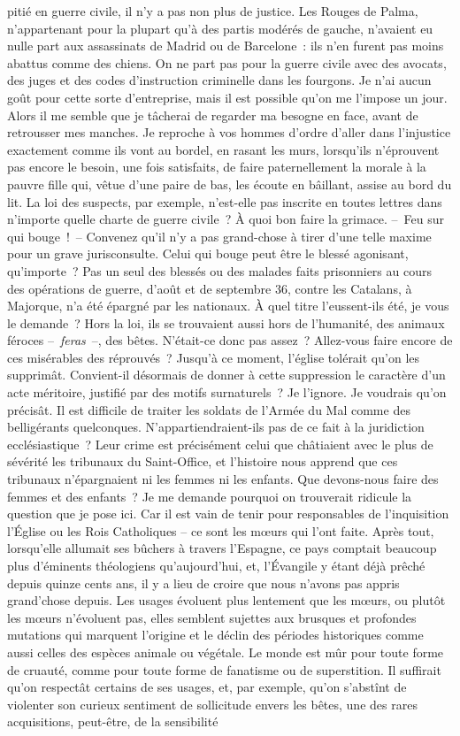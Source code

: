 \documentclass[french,twoside]{book} %
\begin{document}
pitié en guerre civile, il n’y a pas non plus de justice. Les Rouges de Palma, n’appartenant pour la plupart qu’à des partis modérés de gauche, n’avaient eu nulle part aux assassinats de Madrid ou de Barcelone : ils n’en furent pas moins abattus comme des chiens. On ne part pas pour la guerre civile avec des avocats, des juges et des codes d’instruction criminelle dans les fourgons. Je n’ai aucun goût pour cette sorte d’entreprise, mais il est possible qu’on me l’impose un jour. Alors il me semble que je tâcherai de regarder ma besogne en face, avant de retrousser mes manches. Je reproche à vos hommes d’ordre d’aller dans l’injustice exactement comme ils vont au bordel, en rasant les murs, lorsqu’ils n’éprouvent pas encore le besoin, une fois satisfaits, de faire paternellement la morale à la pauvre fille qui, vêtue d’une paire de bas, les écoute en bâillant, assise au bord du lit. La loi des suspects, par exemple, n’est-elle pas inscrite en toutes lettres dans n’importe quelle charte de guerre civile ? À quoi bon faire la grimace. – Feu sur qui bouge ! – Convenez qu’il n’y a pas grand-chose à tirer d’une telle maxime pour un grave jurisconsulte. Celui qui bouge peut être le blessé agonisant, qu’importe ? Pas un seul des blessés ou des malades faits prisonniers au cours des opérations de guerre, d’août et de septembre 36, contre les Catalans, à Majorque, n’a été épargné par les nationaux. À quel titre l’eussent-ils été, je vous le demande ? Hors la loi, ils se trouvaient aussi hors de l’humanité, des animaux féroces – \emph{feras} –, des bêtes. N’était-ce donc pas assez ? Allez-vous faire encore de ces misérables des réprouvés ? Jusqu’à ce moment, l’église tolérait qu’on les supprimât. Convient-il désormais de donner à cette suppression le caractère d’un acte méritoire, justifié par des motifs surnaturels ? Je l’ignore. Je voudrais qu’on précisât. Il est difficile de traiter les soldats de l’Armée du Mal comme des belligérants quelconques. N’appartiendraient-ils pas de ce fait à la juridiction ecclésiastique ? Leur crime est précisément celui que châtiaient avec le plus de sévérité les tribunaux du Saint-Office, et l’histoire nous apprend que ces tribunaux n’épargnaient ni les femmes ni les enfants. Que devons-nous faire des femmes et des enfants ? Je me demande pourquoi on trouverait ridicule la question que je pose ici. Car il est vain de tenir pour responsables de l’inquisition l’Église ou les Rois Catholiques – ce sont les mœurs qui l’ont faite. Après tout, lorsqu’elle allumait ses bûchers à travers l’Espagne, ce pays comptait beaucoup plus d’éminents théologiens qu’aujourd’hui, et, l’Évangile y étant déjà prêché depuis quinze cents ans, il y a lieu de croire que nous n’avons pas appris grand’chose depuis. Les usages évoluent plus lentement que les mœurs, ou plutôt les mœurs n’évoluent pas, elles semblent sujettes aux brusques et profondes mutations qui marquent l’origine et le déclin des périodes historiques comme aussi celles des espèces animale ou végétale. Le monde est mûr pour toute forme de cruauté, comme pour toute forme de fanatisme ou de superstition. Il suffirait qu’on respectât certains de ses usages, et, par exemple, qu’on s’abstînt de violenter son curieux sentiment de sollicitude envers les bêtes, une des rares acquisitions, peut-être, de la sensibilité 
\end{document}
